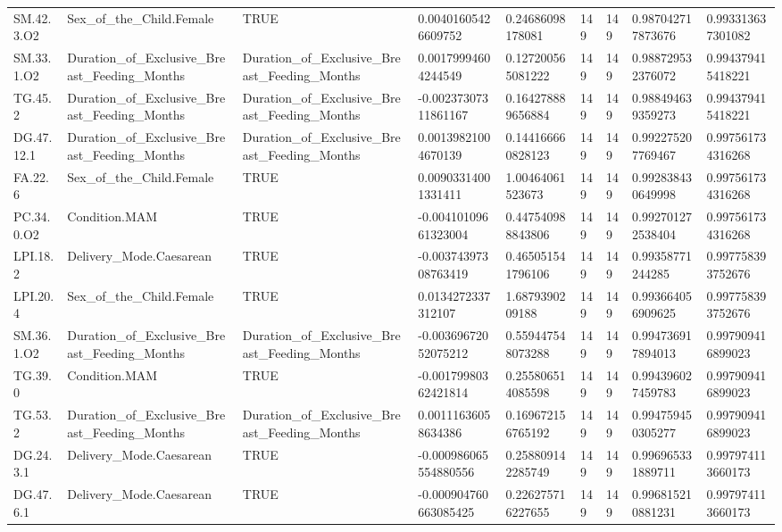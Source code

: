 \begin{longtable}{lllllllll}
SM.42.3.O2 & Sex\_of\_the\_Child.Female & TRUE & 0.00401605426609752 & 0.24686098178081 & 149 & 149 & 0.987042717873676 & 0.993313637301082 \\
SM.33.1.O2 & Duration\_of\_Exclusive\_Breast\_Feeding\_Months & Duration\_of\_Exclusive\_Breast\_Feeding\_Months & 0.00179994604244549 & 0.127200565081222 & 149 & 149 & 0.988729532376072 & 0.994379415418221 \\
TG.45.2 & Duration\_of\_Exclusive\_Breast\_Feeding\_Months & Duration\_of\_Exclusive\_Breast\_Feeding\_Months & -0.00237307311861167 & 0.164278889656884 & 149 & 149 & 0.988494639359273 & 0.994379415418221 \\
DG.47.12.1 & Duration\_of\_Exclusive\_Breast\_Feeding\_Months & Duration\_of\_Exclusive\_Breast\_Feeding\_Months & 0.00139821004670139 & 0.144166660828123 & 149 & 149 & 0.992275207769467 & 0.997561734316268 \\
FA.22.6 & Sex\_of\_the\_Child.Female & TRUE & 0.00903314001331411 & 1.00464061523673 & 149 & 149 & 0.992838430649998 & 0.997561734316268 \\
PC.34.0.O2 & Condition.MAM & TRUE & -0.00410109661323004 & 0.447540988843806 & 149 & 149 & 0.992701272538404 & 0.997561734316268 \\
LPI.18.2 & Delivery\_Mode.Caesarean & TRUE & -0.00374397308763419 & 0.465051541796106 & 149 & 149 & 0.99358771244285 & 0.997758393752676 \\
LPI.20.4 & Sex\_of\_the\_Child.Female & TRUE & 0.0134272337312107 & 1.6879390209188 & 149 & 149 & 0.993664056909625 & 0.997758393752676 \\
SM.36.1.O2 & Duration\_of\_Exclusive\_Breast\_Feeding\_Months & Duration\_of\_Exclusive\_Breast\_Feeding\_Months & -0.00369672052075212 & 0.559447548073288 & 149 & 149 & 0.994736917894013 & 0.997909416899023 \\
TG.39.0 & Condition.MAM & TRUE & -0.00179980362421814 & 0.255806514085598 & 149 & 149 & 0.994396027459783 & 0.997909416899023 \\
TG.53.2 & Duration\_of\_Exclusive\_Breast\_Feeding\_Months & Duration\_of\_Exclusive\_Breast\_Feeding\_Months & 0.00111636058634386 & 0.169672156765192 & 149 & 149 & 0.994759450305277 & 0.997909416899023 \\
DG.24.3.1 & Delivery\_Mode.Caesarean & TRUE & -0.000986065554880556 & 0.258809142285749 & 149 & 149 & 0.996965331889711 & 0.997974113660173 \\
DG.47.6.1 & Delivery\_Mode.Caesarean & TRUE & -0.000904760663085425 & 0.226275716227655 & 149 & 149 & 0.996815210881231 & 0.997974113660173 \\

\end{longtable}
